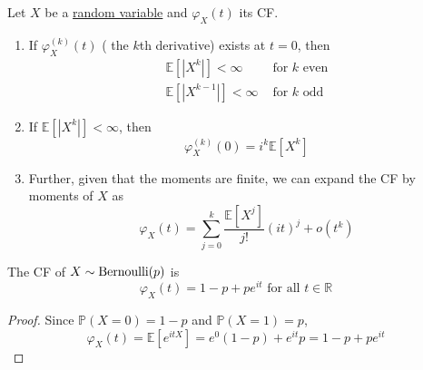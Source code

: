 	\begin{theorem}
	  \label{thm:moment-generating-property-2}
		Let $X$ be a \hyperref[def:random-variable]{random variable} and $\varphi_X (t)$ its CF. 
		\begin{enumerate}
			\item If $\varphi_X^{(k)} (t)$ ( the $k$th derivative) exists at $t = 0$, then 
			\begin{align*}
				\mathbb{E}[|X^k|] < \infty & \text{ for } k \text{ even} \\
				\mathbb{E}[|X^{k-1}|] < \infty & \text{ for } k \text{ odd}
			\end{align*}
			
			\item If $\mathbb{E}[|X^k|] < \infty$, then 
			\begin{equation}
				\varphi_X^{(k)} (0) = i^k \mathbb{E}[X^k]
			\end{equation}
			
			\item Further, given that the moments are finite, we can expand the CF by moments of $X$ as 
			\begin{equation}
				\varphi_X (t) = \sum_{j=0}^k \frac{\mathbb{E}[X^j]}{j!} (i t)^j + o(t^k)
			\end{equation}
		\end{enumerate}
	\end{theorem}

	\begin{theorem}
	  \label{thm:cf-of-bernoulli-distribution}
		The CF of \hyperref[def:indicator-bernoulli-random-variable]{$X \sim \operatorname{Bernoulli}(p)$} is 
		\begin{equation}
			\varphi_X (t) = 1 - p + p e^{i t} \text{ for all } t \in \mathbb{R}
		\end{equation}
	\end{theorem}
	\begin{proof}
		Since $\mathbb{P}(X = 0) = 1 - p$ and $\mathbb{P}(X = 1) = p$, 
		\begin{equation}
			\varphi_X (t) = \mathbb{E}[e^{i t X}] = e^{0} (1 - p) + e^{i t} p = 1 - p + p e^{i t}
		\end{equation}
	\end{proof}

